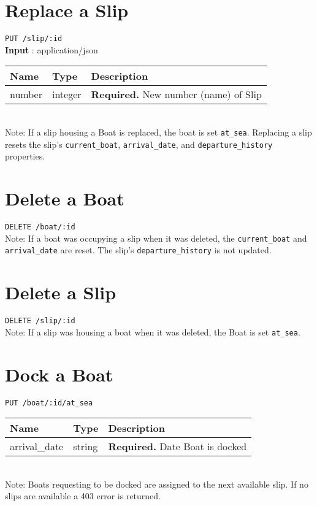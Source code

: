 \documentclass{article}
\begin{document}
\section*{Replace a Slip}
\texttt{PUT /slip/:id} \\
\textbf{Input} : application/json \\
\begin{tabular}{| l | l | l |}
	\hline
	\textbf{Name} & \textbf{Type} & \textbf{Description} \\
	\hline
	number        & integer        & \textbf{Required.} New number (name) of Slip \\
	\hline
\end{tabular}
\\
Note: If a slip housing a Boat is replaced, the boat is set \texttt{at\_sea}. Replacing a slip
resets the slip's \texttt{current\_boat}, \texttt{arrival\_date}, and \texttt{departure\_history} 
properties.

\section*{Delete a Boat}
\texttt{DELETE /boat/:id} \\
Note: If a boat was occupying a slip when it was deleted, the \texttt{current\_boat} and
\texttt{arrival\_date} are reset. The slip's \texttt{departure\_history} is not updated.

\section*{Delete a Slip}
\texttt{DELETE /slip/:id} \\
Note: If a slip was housing a boat when it was deleted, the Boat is set \texttt{at\_sea}.

\section*{Dock a Boat}
\texttt{PUT /boat/:id/at\_sea} \\
\begin{tabular}{| l | l | l |}
	\hline
	\textbf{Name} & \textbf{Type} & \textbf{Description} \\
	\hline
	arrival\_date & string        & \textbf{Required.} Date Boat is docked \\
	\hline
\end{tabular} \\
Note: Boats requesting to be docked are assigned to the next available slip. If no slips
are available a 403 error is returned.
\end{document}
